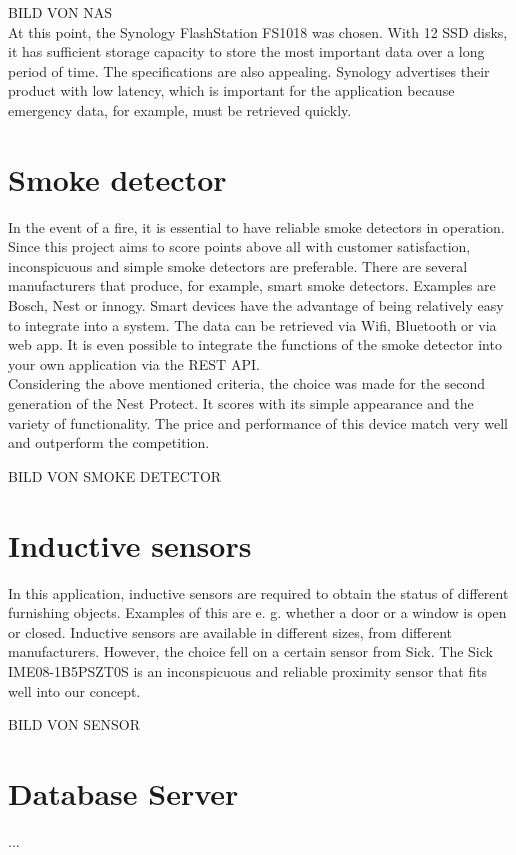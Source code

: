 BILD VON NAS
\\
At this point, the Synology FlashStation FS1018 was chosen. With 12 SSD disks, it has sufficient storage capacity to store the most important data over a long period of time. The specifications are also appealing. Synology advertises their product with low latency, which is important for the application because emergency data, for example, must be retrieved quickly.

\section{Smoke detector}
In the event of a fire, it is essential to have reliable smoke detectors in operation. Since this project aims to score points above all with customer satisfaction, inconspicuous and simple smoke detectors are preferable. There are several manufacturers that produce, for example, smart smoke detectors. Examples are Bosch, Nest or innogy. Smart devices have the advantage of being relatively easy to integrate into a system. The data can be retrieved via Wifi, Bluetooth or via web app. It is even possible to integrate the functions of the smoke detector into your own application via the REST API.
\\
Considering the above mentioned criteria, the choice was made for the second generation of the Nest Protect. It scores with its simple appearance and the variety of functionality.  The price and performance of this device match very well and outperform the competition.

BILD VON SMOKE DETECTOR

\section{Inductive sensors}
In this application, inductive sensors are required to obtain the status of different furnishing objects. Examples of this are e. g. whether a door or a window is open or closed. Inductive sensors are available in different sizes, from different manufacturers. However, the choice fell on a certain sensor from Sick. The Sick IME08-1B5PSZT0S is an inconspicuous and reliable proximity sensor that fits well into our concept. 

BILD VON SENSOR

\section{Database Server}
...

